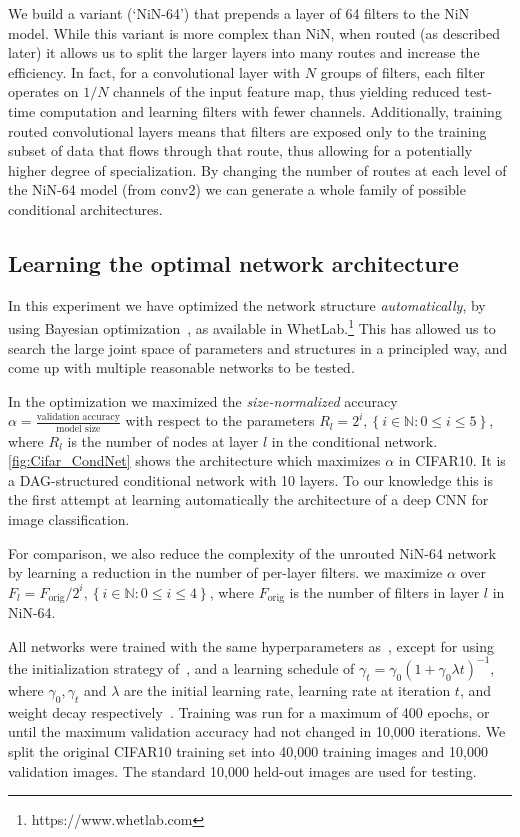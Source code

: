 \documentclass[thesis]{subfiles}
\begin{document}
	We build a variant (`NiN-64') that prepends a layer of 64 filters to the NiN model.
	While this variant is more complex than NiN, when routed (as described later) it allows us 
	to split the larger layers into many routes and increase the efficiency.
	In fact, for a convolutional layer with $N$ groups of filters, each filter operates on $1/N$ channels of the input feature map, thus yielding reduced test-time computation and learning filters with fewer channels. 
	Additionally, training routed convolutional layers means that filters are exposed only to the training subset of data that flows through that route, thus allowing for a potentially higher degree of specialization.
	By changing the number of routes at each level of the NiN-64 model (from conv2) we can 
	generate a whole family of possible conditional architectures. 
	
	\subsection{Learning the optimal network architecture}
	In this experiment we have optimized the network structure {\em automatically}, 
	by using Bayesian optimization~\citep{Snoek2012}, as available in WhetLab.\footnote{https://www.whetlab.com} 
	This has allowed us to search the large joint space of parameters and structures in a principled way, 
	and come up with multiple reasonable networks to be tested. 
	
	In the optimization we maximized the {\em size-normalized} accuracy $\alpha =\frac{\textrm{validation accuracy}}{\textrm{model size}}$ with respect to the parameters $R_l = 2^i, \left\{i\in \mathbb{N} : 0 \le i \le 5\right\}$, where $R_l$ is the number of nodes at layer $l$ in the conditional network. 
	\cref{fig:Cifar_CondNet} shows the architecture which maximizes $\alpha$ in CIFAR10. 
	It is a DAG-structured conditional network with 10 layers.
	To our knowledge this is the first attempt at learning automatically the architecture of a deep CNN for image classification.
	
	For comparison, we also reduce the complexity of the unrouted NiN-64 network by learning a reduction in the number of per-layer filters. 
	\ie we maximize $\alpha$ over $F_l = F_\textrm{orig}/2^i, \left\{i\in \mathbb{N} : 0 \le i \le 4\right\}$, where $F_\textrm{orig}$ is the number of filters in layer $l$ in NiN-64. 
	
	All networks were trained with the same hyperparameters as~\citep{Lin2013NiN}, 
	except for using the initialization strategy of~\citep{He2015b}, 
	and a learning schedule of $\gamma_t = \gamma_0(1+\gamma_0\lambda t)^{-1}$, where $\gamma_0,\gamma_t$ and $\lambda$ are the initial learning rate, learning rate at iteration $t$, and weight decay respectively~\citep{Bottou2012sgdtricks}. Training was run for a maximum of 400 epochs, or until the maximum validation accuracy had not changed in 10,000 iterations. 
	We split the original CIFAR10 training set into 40,000 training images and 
	10,000 validation images. 
	The standard 10,000 held-out images are used for testing.
	
\end{document}
